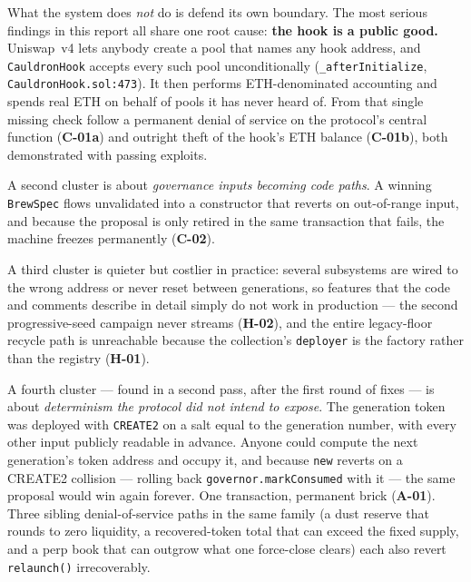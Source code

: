 \documentclass[10pt,a4paper]{article}
\newcommand{\code}[1]{\texttt{\small #1}}
\begin{document}
What the system does \emph{not} do is defend its own boundary. The most serious
findings in this report all share one root cause: \textbf{the hook is a public
good.} Uniswap~v4 lets anybody create a pool that names any hook address, and
\code{CauldronHook} accepts every such pool unconditionally
(\code{\_afterInitialize}, \code{CauldronHook.sol:473}). It then performs
ETH-denominated accounting and spends real ETH on behalf of pools it has never
heard of. From that single missing check follow a permanent denial of service on
the protocol's central function (\textbf{C-01a}) and outright theft of the
hook's ETH balance (\textbf{C-01b}), both demonstrated with passing exploits.

A second cluster is about \emph{governance inputs becoming code paths}. A
winning \code{BrewSpec} flows unvalidated into a constructor that reverts on
out-of-range input, and because the proposal is only retired in the same
transaction that fails, the machine freezes permanently (\textbf{C-02}).

A third cluster is quieter but costlier in practice: several subsystems are
wired to the wrong address or never reset between generations, so features that
the code and comments describe in detail simply do not work in production ---
the second progressive-seed campaign never streams (\textbf{H-02}), and the
entire legacy-floor recycle path is unreachable because the collection's
\code{deployer} is the factory rather than the registry (\textbf{H-01}).

A fourth cluster --- found in a second pass, after the first round of fixes ---
is about \emph{determinism the protocol did not intend to expose}. The
generation token was deployed with \code{CREATE2} on a salt equal to the
generation number, with every other input publicly readable in advance. Anyone
could compute the next generation's token address and occupy it, and because
\code{new} reverts on a CREATE2 collision --- rolling back
\code{governor.markConsumed} with it --- the same proposal would win again
forever. One transaction, permanent brick (\textbf{A-01}). Three sibling
denial-of-service paths in the same family (a dust reserve that rounds to zero
liquidity, a recovered-token total that can exceed the fixed supply, and a perp
book that can outgrow what one force-close clears) each also revert
\code{relaunch()} irrecoverably.

\medskip
\noindent{}
\end{document}

